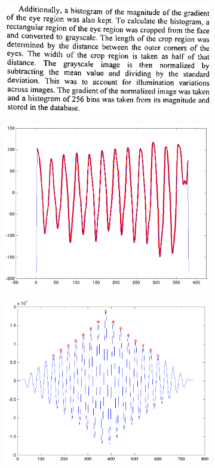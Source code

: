 \documentclass{report}
\begin{document}
\begin{figure}%
\setcounter{subfigure}{0}
\centering
\begin{subfigure}{.33\columnwidth}
\includegraphics[width=\columnwidth]{textblock.png}%
\label{textblock}
\end{subfigure}\hfill%
\begin{subfigure}{.33\columnwidth}
\includegraphics[width=\columnwidth]{texthist.png}%
\label{texthist}
\end{subfigure}
\begin{subfigure}{.33\columnwidth}
\includegraphics[width=\columnwidth]{textauto.png}%

\end{subfigure}
\end{figure}
\end{document}
